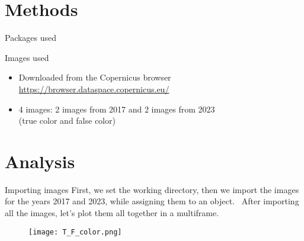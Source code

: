 \documentclass{beamer}
\begin{document}
\section{Methods}

\begin{frame}{Packages used}
    
\end{frame}

\begin{frame}{Images used}
    \begin{itemize}
        \item Downloaded from the Copernicus browser \url{https://browser.dataspace.copernicus.eu/}
        \item 4 images: 2 images from 2017 and 2 images from 2023 \\(true color  and false color)
    \end{itemize}
\end{frame}

\section{Analysis}

\begin{frame}{Importing images}
\scriptsize{First, we set the working directory, then we import the images for the years 2017 and 2023, while assigning them to an object.}
     \  
    \scriptsize{After importing all the images, let's plot them all together in a multiframe.}
   \begin{minipage}{0.45\textwidth} 
   \end{minipage}
   \begin{minipage}{0.48\textwidth}
    \begin{figure}
        \texttt{[image: T\_F\_color.png]}
    \end{figure}
    \end{minipage}    
\end{frame}
\end{document}
